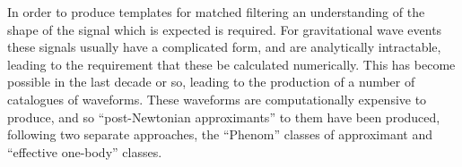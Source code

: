 In order to produce templates for matched filtering an understanding
of the shape of the signal which is expected is required. For
gravitational wave events these signals usually have a complicated
form, and are analytically intractable, leading to the requirement
that these be calculated numerically. This has become possible in the
last decade or so, leading to the production of a number of catalogues
of
waveforms\cite{PhysRevLett.106.241101,gatechcat,2016PhRvD..93d4006H}. These
waveforms are computationally expensive to produce, and so ``post-Newtonian
approximants'' to them have been produced, following two separate
approaches, the ``Phenom'' classes of
approximant\cite{2016PhRvD..93d4007K,2007CQGra..24S.689A} and
``effective one-body'' classes\cite{2007PhRvD..76j4049B}.


